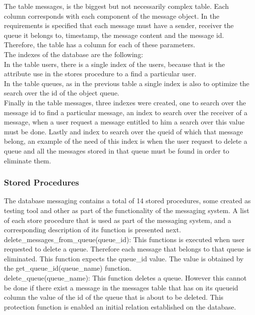 The table messages, is the biggest but not necessarily complex table. Each column corresponds with each component of the message object. In the requirements is specified that each message must have a sender, receiver the queue it belongs to, timestamp, the message content and the message id. Therefore, the table has a column for each of these parameters.\\

The indexes of the database are the following:\\
In the table users, there is a single index of the users, because that is the attribute use in the stores procedure to a find a particular user.\\
In the table queues, as in the previous table a single index is also to optimize the search over the id of the object queue.\\
Finally in the table messages, three indexes were created, one to search over the message id to find a particular message, an index to search over the receiver of a message, when a user request a message entitled to him a search over this value must be done. Lastly and index to search over the queid of which that message belong, an example of the need of this index is when the user request to delete a queue and all the messages stored in that queue must be found in order to eliminate them.


\subsubsection{Stored Procedures}\label{sec:stored-procedures}
The database messaging contains a total of 14 stored procedures, some created as testing tool and other as part of the functionality of the messaging system. A list of each store procedure that is used as part of the messaging system, and a corresponding description of its function is presented next.\\
delete\_messages\_from\_queue(queue\_id): This functions is executed when user requested to delete a queue. Therefore each message that belongs to that queue is eliminated. This function expects the queue\_id value. The value is obtained by the get\_queue\_id(queue\_name) function.\\

delete\_queue(queue\_name): This function deletes a queue. However this cannot be done if there exist a message in the messages table that has on its queueid column the value of the id of the queue that is about to be deleted. This protection function is enabled an initial relation established on the database.\\

